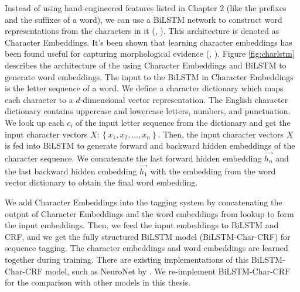 Instead of using hand-engineered features listed in Chapter 2 (like the prefixes and the suffixes of a word), we can use a BiLSTM network to construct word representations from the characters in it (\citeauthor{lample2016neural}, \citeyear{lample2016neural}). This architecture is denoted as Character Embeddings. It's been shown that learning character embeddings has been found useful for capturing morphological evidence (\citeauthor{ling2015finding}, \citeyear{ling2015finding}). Figure \ref{fig:charlstm} describes the architecture of the using Character Embeddings and BiLSTM to generate word embeddings. The input to the BiLSTM in Character Embeddings is the letter sequence of a word. We define a character dictionary which maps each character to a $d$-dimensional vector representation. The English character dictionary contains uppercase and lowercase letters, numbers, and punctuation. We look up each $c_{i}$ of the input letter sequence from the dictionary and get the input character vectors $X:\left\{x_{1},x_{2},\dots,x_{n}\right\}$. Then, the input character vectors $X$ is fed into BiLSTM to generate forward and backward hidden embeddings of the character sequence. We concatenate the last forward hidden embedding $\overrightarrow {h_{n}}$ and the last backward hidden embedding $\overrightarrow {h_{1}}$ with the embedding from the word vector dictionary to obtain the final word embedding.

We add Character Embeddings into the tagging system by concatenating the output of Character Embeddings and the word embeddings from lookup to form the input embeddings. Then, we feed the input embeddings to BiLSTM and CRF, and we get the fully structured BiLSTM model (BiLSTM-Char-CRF) for sequence tagging. The character embeddings and word embeddings are learned together during training. There are existing implementations of this BiLSTM-Char-CRF model, such as NeuroNet by \cite{2017neuroner}. We re-implement BiLSTM-Char-CRF for the comparison with other models in this thesis.

